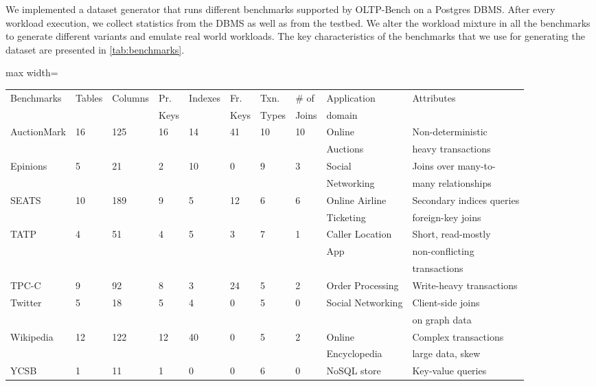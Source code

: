 We implemented a dataset generator that runs different benchmarks supported
by OLTP-Bench on a Postgres DBMS. After every workload execution, we
collect statistics from the DBMS as well as from the testbed. We alter the
workload mixture in all the benchmarks to generate different variants and
emulate real world workloads. The key characteristics of the benchmarks
that we use for generating the dataset are presented in \cref{tab:benchmarks}.

\begin{table*}[ht!]
  \centering
  \begin{adjustbox}{max width=\textwidth}
  \begin{tabular}{l|lllllllll} \toprule
   Benchmarks & Tables & Columns & Pr. & Indexes &	Fr. & 
   Txn. & \# of & Application  & Attributes  \\
   & & & Keys & & Keys & Types & Joins  & domain & \\
   \midrule
	AuctionMark 	& 16 	& 125  &	16 &	14 &	41 &	10 &	10 &	Online &
	Non-deterministic\\
	& & & & & & & & Auctions &  heavy transactions \\
	Epinions 		& 5 	& 21   & 	2  &	10 &	 0 & 	9  &	3  &	Social  & Joins over
	many-to- \\
	& & & & & & & & Networking & many relationships  \\
	SEATS &	10 &	189 &	9 	& 5 	& 12 	& 6 &	6 &	Online Airline  &
	Secondary indices queries\\
	& & & & & & & & Ticketing & foreign-key joins \\
	TATP &	4 	& 51 &	4 &	5 &	3 &	7 &	1 &	Caller Location  &	Short, read-mostly\\
	& & & & & & & & App & non-conflicting\\
	& & & & & & & & &  transactions\\
	TPC-C &	9 &	92 &	8 &	3 &	24 &	5 &	2 &	Order Processing & Write-heavy
	transactions\\
	Twitter &	5 &	18 &	5 &	4 &	0 &	5 &	0 &	Social Networking & Client-side joins \\
	& & & & & & & & & on	graph data \\
	Wikipedia &	12 &	122 &	12 &	40 &	0 &	5 &	2 &	Online &	Complex	transactions \\ 
	& & & & & & & & Encyclopedia & large data, skew  \\
	YCSB &	1 &	11 &	1 &	0 &	0 &	6 &	0 &	NoSQL store &	Key-value queries \\
   \bottomrule
   \end{tabular}
   \end{adjustbox} 
\caption{Key characteristics of the benchmarks used in our evaluation. ``Pr. key''
denotes primary key and ``Fr. key'' denotes foreign key.}
\label{tab:benchmarks}
\end{table*}


